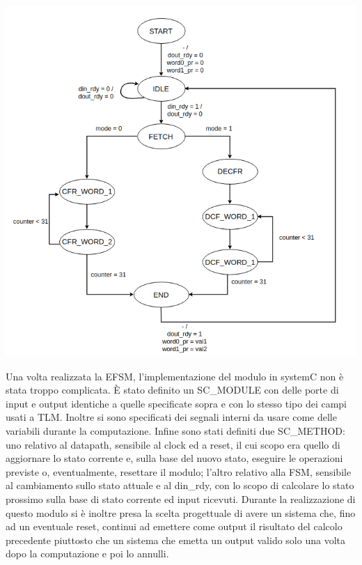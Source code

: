 \documentclass[]{IEEEtran}
\begin{document}
\begin{center}
	\centering
	\includegraphics[width=\columnwidth]{Images/scheme6.png}
	\label{scheme6}
\end{center}
Una volta realizzata la EFSM, l'implementazione del modulo in systemC non è stata troppo complicata. È stato definito un SC\_MODULE con delle porte di input e output identiche a quelle specificate sopra e con lo stesso tipo dei campi usati a TLM. Inoltre si sono specificati dei segnali interni da usare come delle variabili durante la computazione. Infine sono stati definiti due SC\_METHOD: uno relativo al datapath, sensibile al clock ed a reset, il cui scopo era quello di aggiornare lo stato corrente e, sulla base del nuovo stato, eseguire le operazioni previste o, eventualmente, resettare il modulo; l'altro relativo alla FSM, sensibile al cambiamento sullo stato attuale e  al din\_rdy, con lo scopo di calcolare lo stato prossimo sulla base di stato corrente ed input ricevuti. Durante la realizzazione di questo modulo si è inoltre presa la scelta progettuale di avere un sistema che, fino ad un eventuale reset, continui ad emettere come output il risultato del calcolo precedente piuttosto che un sistema che emetta un output valido solo una volta dopo la computazione e poi lo annulli.
\end{document}
